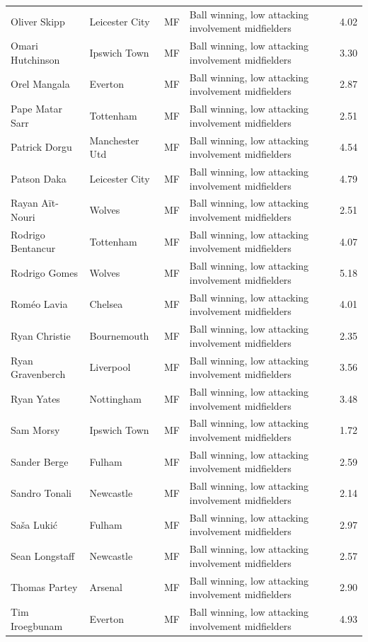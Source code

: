 \begin{longtable}{p{3.4cm}p{2.5cm}p{1.0cm}p{5.0cm}r}
Oliver Skipp & Leicester City & MF & Ball winning, low attacking involvement midfielders & 4.02 \\
Omari Hutchinson & Ipswich Town & MF & Ball winning, low attacking involvement midfielders & 3.30 \\
Orel Mangala & Everton & MF & Ball winning, low attacking involvement midfielders & 2.87 \\
Pape Matar Sarr & Tottenham & MF & Ball winning, low attacking involvement midfielders & 2.51 \\
Patrick Dorgu & Manchester Utd & MF & Ball winning, low attacking involvement midfielders & 4.54 \\
Patson Daka & Leicester City & MF & Ball winning, low attacking involvement midfielders & 4.79 \\
Rayan Aït-Nouri & Wolves & MF & Ball winning, low attacking involvement midfielders & 2.51 \\
Rodrigo Bentancur & Tottenham & MF & Ball winning, low attacking involvement midfielders & 4.07 \\
Rodrigo Gomes & Wolves & MF & Ball winning, low attacking involvement midfielders & 5.18 \\
Roméo Lavia & Chelsea & MF & Ball winning, low attacking involvement midfielders & 4.01 \\
Ryan Christie & Bournemouth & MF & Ball winning, low attacking involvement midfielders & 2.35 \\
Ryan Gravenberch & Liverpool & MF & Ball winning, low attacking involvement midfielders & 3.56 \\
Ryan Yates & Nottingham & MF & Ball winning, low attacking involvement midfielders & 3.48 \\
Sam Morsy & Ipswich Town & MF & Ball winning, low attacking involvement midfielders & 1.72 \\
Sander Berge & Fulham & MF & Ball winning, low attacking involvement midfielders & 2.59 \\
Sandro Tonali & Newcastle & MF & Ball winning, low attacking involvement midfielders & 2.14 \\
Saša Lukić & Fulham & MF & Ball winning, low attacking involvement midfielders & 2.97 \\
Sean Longstaff & Newcastle & MF & Ball winning, low attacking involvement midfielders & 2.57 \\
Thomas Partey & Arsenal & MF & Ball winning, low attacking involvement midfielders & 2.90 \\
Tim Iroegbunam & Everton & MF & Ball winning, low attacking involvement midfielders & 4.93 \\

\end{longtable}
